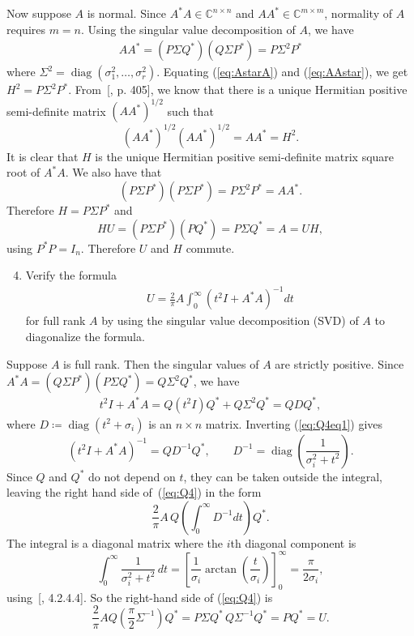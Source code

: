 \documentclass[10pt, A4paper]{article}
\newcommand{\mxm}{m \times m}
\newcommand{\nxn}{n \times n}
\DeclareMathOperator{\diag}{diag}
\begin{document}
Now suppose $A$ is normal. Since $A^*A \in \mathbb{C}^{n\times n}$ and
$AA^* \in \mathbb{C}^{\mxm}$, normality of $A$ requires $m=n$.
Using the singular value decomposition of $A$, we have
\begin{align}
	AA^* = (P\Sigma Q^*) (Q\Sigma P^*) = P\Sigma^2 P^*
	\label{eq:AAstar}
\end{align}
where $\Sigma^2 = \diag(\sigma_1^2, \ldots,\sigma_r^2)$.
Equating (\ref{eq:AstarA}) and (\ref{eq:AAstar}), we get 
$H^2 = P\Sigma^2P^*$. From~[\citealp{hojo1985}, p. 405], we know 
that there
is a unique Hermitian positive semi-definite matrix $(AA^*)^{1/2}$ such 
that $$(AA^*)^{1/2}(AA^*)^{1/2} = AA^* = H^2.$$
It is clear that $H$ is the unique Hermitian positive semi-definite 
matrix square root of $A^*A$.
We also have that
$$(P\Sigma P^*) (P\Sigma P^*) = P \Sigma^2P^* = AA^*.$$
Therefore $H = P\Sigma P^*$ and
$$HU = (P\Sigma P^*) (PQ^*) = P \Sigma Q^* = A = UH,$$
using $P^*P = I_n$. Therefore $U$ and $H$ commute.
 
 
 
 

\vspace{0.2cm}
\begin{enumerate}
	\setcounter{enumi}{3}
	\item Verify the formula
	\begin{align*}
		U = \frac{2}{\pi}A \int_{0}^{\infty} (t^2I + A^*A)^{-1}dt
		\tag{*}
		\label{eq:Q4}
	\end{align*}
	for full rank $A$ by using the singular value decomposition (SVD)
	of $A$ to diagonalize the formula.
\end{enumerate}

Suppose $A$ is full rank. Then the singular values of $A$ are strictly 
positive. Since $A^*A = (Q\Sigma P^*)(P\Sigma Q^*) = Q\Sigma^2Q^*$, we 
have
\begin{align}
	t^2I + A^*A = Q(t^2I)Q^* + Q \Sigma^2Q^* = QDQ^*,
	\label{eq:Q4eq1}
\end{align}
where $D \coloneqq \diag(t^2 + \sigma_i)$ is an $\nxn$ matrix.
Inverting (\ref{eq:Q4eq1}) gives
$$
	(t^2I + A^*A)^{-1} = QD^{-1}Q^*, \qquad
	D^{-1} = \diag\left(\frac{1}{\sigma_i^2 + t^2} \right).
$$
Since $Q$ and $Q^*$ do not depend on $t$, they can be taken outside the 
integral, leaving the right hand side of~(\ref{eq:Q4}) in the form
$$
	\frac{2}{\pi} A\, Q \left(\int_{0}^{\infty}D^{-1}dt\right) Q^*.
$$
The integral is a diagonal matrix where the $i$th diagonal component is
$$
	\int_{0}^{\infty} \frac{1}{\sigma_i^2 + t^2} \, dt =
	\left[\frac{1}{\sigma_i} \arctan \left(\frac{t}{\sigma_i}\right)
	\right]_0^{\infty} = \frac{\pi}{2\sigma_i},
$$
using~[\citealp{jeda2008}, 4.2.4.4]. So the right-hand side of 
(\ref{eq:Q4}) is
$$
	\frac{2}{\pi} A Q \left(\frac{\pi}{2} \Sigma^{-1}\right)Q^* = 
	P\Sigma Q^* \, Q \Sigma^{-1}Q^* = PQ^* = U.
$$
\end{document}
